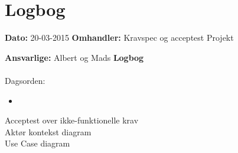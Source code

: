 \chapter{Logbog}

\textbf{Dato:} 20-03-2015
\textbf{Omhandler: } Kravspec og acceptest Projekt

\textbf{Ansvarlige:} Albert og Mads
\textbf{Logbog}
\\
\\
Dagsorden:
\begin{itemize}
	\item 
\end{itemize}

Acceptest over ikke-funktionelle krav \\
Aktør kontekst diagram
\\ Use Case diagram